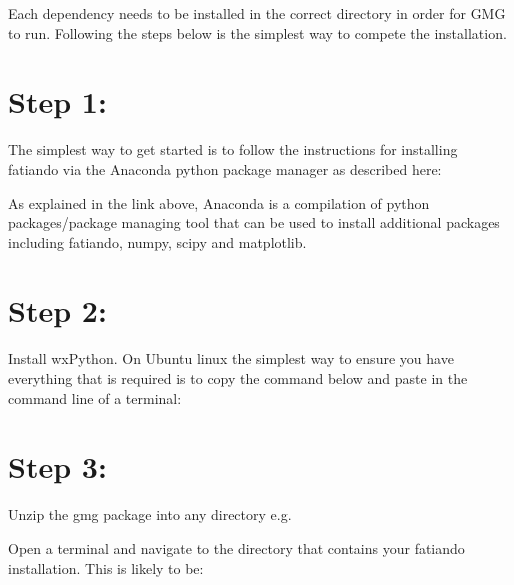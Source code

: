 \documentclass[a4paper,12pt,english]{sphinxmanual}
\begin{document}
Each dependency needs to be installed in the correct directory in order for GMG to run. Following the steps below is
the simplest way to compete the installation.


\chapter{Step 1:}
\label{\detokenize{installation:step-1}}
The simplest way to get started is to follow the instructions for installing fatiando via the Anaconda
python package manager as described here:


As explained in the link above, Anaconda is a compilation of python packages/package
managing tool that can be used to install additional packages including fatiando, numpy, scipy and matplotlib.


\chapter{Step 2:}
\label{\detokenize{installation:step-2}}
Install wxPython. On Ubuntu linux the simplest way to ensure you have everything that is required
is to copy the command below and paste in the command line of a terminal:

\begin{sphinxVerbatim}[commandchars=\\\{\}]
       
\end{sphinxVerbatim}


\chapter{Step 3:}
\label{\detokenize{installation:step-3}}
Unzip the gmg package into any directory e.g. 

Open a terminal and navigate to the directory that contains your fatiando installation.
This is likely to be:

\begin{sphinxVerbatim}[commandchars=\\\{\}]
 
\end{sphinxVerbatim}
\end{document}
